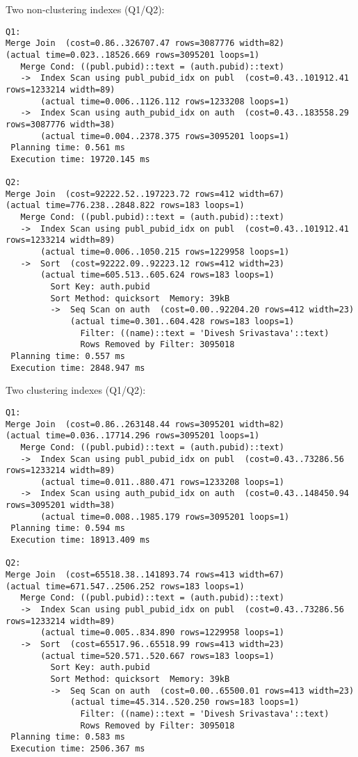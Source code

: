 \documentclass[11pt]{scrartcl}
\begin{document}
\noindent Two non-clustering indexes (Q1/Q2):
{\small
\begin{verbatim}
Q1:
Merge Join  (cost=0.86..326707.47 rows=3087776 width=82)
(actual time=0.023..18526.669 rows=3095201 loops=1)
   Merge Cond: ((publ.pubid)::text = (auth.pubid)::text)
   ->  Index Scan using publ_pubid_idx on publ  (cost=0.43..101912.41 rows=1233214 width=89)
       (actual time=0.006..1126.112 rows=1233208 loops=1)
   ->  Index Scan using auth_pubid_idx on auth  (cost=0.43..183558.29 rows=3087776 width=38)
       (actual time=0.004..2378.375 rows=3095201 loops=1)
 Planning time: 0.561 ms
 Execution time: 19720.145 ms

Q2:
Merge Join  (cost=92222.52..197223.72 rows=412 width=67)
(actual time=776.238..2848.822 rows=183 loops=1)
   Merge Cond: ((publ.pubid)::text = (auth.pubid)::text)
   ->  Index Scan using publ_pubid_idx on publ  (cost=0.43..101912.41 rows=1233214 width=89)
       (actual time=0.006..1050.215 rows=1229958 loops=1)
   ->  Sort  (cost=92222.09..92223.12 rows=412 width=23)
       (actual time=605.513..605.624 rows=183 loops=1)
         Sort Key: auth.pubid
         Sort Method: quicksort  Memory: 39kB
         ->  Seq Scan on auth  (cost=0.00..92204.20 rows=412 width=23)
             (actual time=0.301..604.428 rows=183 loops=1)
               Filter: ((name)::text = 'Divesh Srivastava'::text)
               Rows Removed by Filter: 3095018
 Planning time: 0.557 ms
 Execution time: 2848.947 ms
\end{verbatim}
}

\noindent Two clustering indexes  (Q1/Q2):
{\small
\begin{verbatim}
Q1:
Merge Join  (cost=0.86..263148.44 rows=3095201 width=82)
(actual time=0.036..17714.296 rows=3095201 loops=1)
   Merge Cond: ((publ.pubid)::text = (auth.pubid)::text)
   ->  Index Scan using publ_pubid_idx on publ  (cost=0.43..73286.56 rows=1233214 width=89)
       (actual time=0.011..880.471 rows=1233208 loops=1)
   ->  Index Scan using auth_pubid_idx on auth  (cost=0.43..148450.94 rows=3095201 width=38)
       (actual time=0.008..1985.179 rows=3095201 loops=1)
 Planning time: 0.594 ms
 Execution time: 18913.409 ms

Q2:
Merge Join  (cost=65518.38..141893.74 rows=413 width=67)
(actual time=671.547..2506.252 rows=183 loops=1)
   Merge Cond: ((publ.pubid)::text = (auth.pubid)::text)
   ->  Index Scan using publ_pubid_idx on publ  (cost=0.43..73286.56 rows=1233214 width=89)
       (actual time=0.005..834.890 rows=1229958 loops=1)
   ->  Sort  (cost=65517.96..65518.99 rows=413 width=23)
       (actual time=520.571..520.667 rows=183 loops=1)
         Sort Key: auth.pubid
         Sort Method: quicksort  Memory: 39kB
         ->  Seq Scan on auth  (cost=0.00..65500.01 rows=413 width=23)
             (actual time=45.314..520.250 rows=183 loops=1)
               Filter: ((name)::text = 'Divesh Srivastava'::text)
               Rows Removed by Filter: 3095018
 Planning time: 0.583 ms
 Execution time: 2506.367 ms
\end{verbatim}
}
\end{document}
